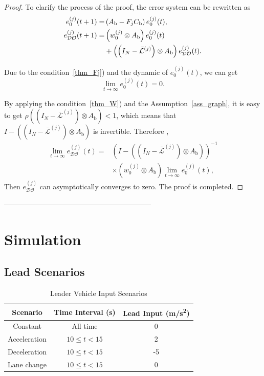 \documentclass[letterpaper, 10pt, conference]{ieeeconf}  %
\def\L{\mathcal{L}} %
\def\DO{\mathcal{DO}} %
\begin{document}
\begin{proof}
To clarify the process of the proof, the error system can be rewritten as 
\begin{subequations}
    \begin{align}
        e_0^{(j)}(t+1) =& \left( A_{\text{b}} - F_{j} C_{\text{b}}  \right) e_0^{(j)}(t), \label{eq_e0}\\
        e_{\DO}^{(j)}(t+1) =& \left( w_{0}^{(j)} \otimes A_{\text{b}} \right) e_0^{(j)}(t) \notag \\
        &+ \left( \left( I_{N} - \bar{\L}^{(j)}  \right)  \otimes  A_{\text{b}} \right) e_{\DO}^{(j)}(t).
    \end{align}
 \end{subequations}
 
Due to the condition~\ref{thm_Fj}) and the dynamic of $e_0^{(j)}(t)$, we can get
\begin{equation}
    \lim_{t\to \infty} e_0^{(j)}(t) = 0.
\end{equation}

By applying the condition~\ref{thm_W}) and the Assumption~\ref{ass_graph}, it is easy to get $\rho \left( \left( I_{N} - \bar{\L}^{(j)} \right)  \otimes  A_{\text{b}} \right) < 1$, which means that
$I - \left( \left( I_{N} - \bar{\L}^{(j)}  \right)  \otimes  A_{\text{b}} \right)$ is invertible. Therefore \cite{bullo2018lectures,Plug_play},
\begin{equation}
\begin{aligned}
    \lim_{t\to \infty} e_{\DO}^{(j)}(t) =& \left(I - \left( \left( I_{N} - \bar{\L}^{(j)}  \right)  \otimes  A_{\text{b}} \right) \right)^{-1} \\
    & \times \left( w_{0}^{(j)} \otimes A_{\text{b}} \right) \lim_{t\to \infty} e_0^{(j)}(t),
\end{aligned}
\end{equation}
Then $e_{\DO}^{(j)}$ can asymptotically converges to zero. The proof is completed. 
\end{proof}


--------------------------------------------------------------

\section{Simulation}\label{sec_simulation}
\subsection{Lead Scenarios}
\begin{table}[h!]
\centering
\caption{Leader Vehicle Input Scenarios}
\begin{tabular}{|c|c|c|}
\hline
\textbf{Scenario} & \textbf{Time Interval (s)} & \textbf{Lead Input (m/s\textsuperscript{2})} \\
\hline
Constant & All time & 0 \\
\hline
Acceleration & $10 \leq t < 15$ & 2 \\
\hline
Deceleration & $10 \leq t < 15$ & -5 \\
\hline
Lane change & $10 \leq t < 15$ & 0 \\
\hline
\end{tabular}
\end{table}
\end{document}

